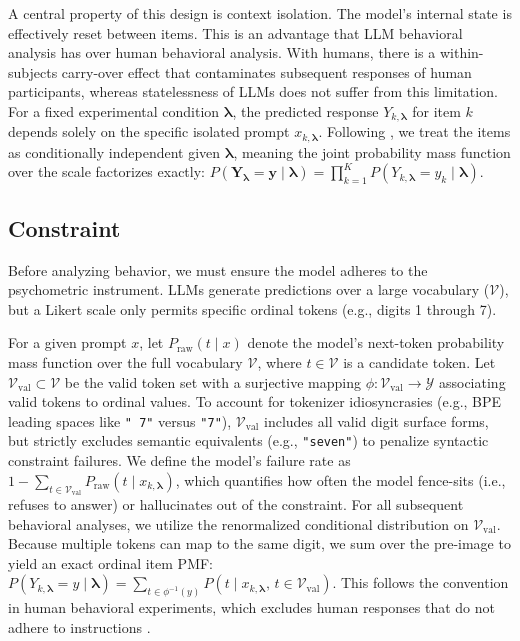 A central property of this design is context isolation. 
The model's internal state is effectively reset between items. 
This is an advantage that LLM behavioral analysis has over human behavioral analysis. 
With humans, there is a within-subjects carry-over effect that contaminates subsequent responses of human participants, whereas statelessness of LLMs does not suffer from this limitation.
For a fixed experimental condition $\boldsymbol{\lambda}$, the predicted response $Y_{k,\boldsymbol{\lambda}}$ for item $k$ depends solely on the specific isolated prompt $x_{k,\boldsymbol{\lambda}}$. 
Following \citet{wadi2025a}, we treat the items as conditionally independent given $\boldsymbol{\lambda}$, meaning the joint probability mass function over the scale factorizes exactly: $P(\mathbf{Y}_{\boldsymbol{\lambda}} = \mathbf{y} \mid \boldsymbol{\lambda}) = \prod_{k=1}^{K} P(Y_{k,\boldsymbol{\lambda}} = y_k \mid \boldsymbol{\lambda})$.


\subsection{Constraint}

Before analyzing behavior, we must ensure the model adheres to the psychometric instrument. LLMs generate predictions over a large vocabulary ($\mathcal{V}$), but a Likert scale only permits specific ordinal tokens (e.g., digits 1 through 7). 

For a given prompt $x$, let $P_{\mathrm{raw}}(t \mid x)$ denote the model's next-token probability mass function over the full vocabulary $\mathcal{V}$, where $t \in \mathcal{V}$ is a candidate token. 
Let $\mathcal{V}_{\mathrm{val}}\subset\mathcal{V}$ be the valid token set with a surjective mapping $\phi:\mathcal{V}_{\mathrm{val}}\to\mathcal{Y}$ associating valid tokens to ordinal values. 
To account for tokenizer idiosyncrasies (e.g., BPE leading spaces like \texttt{" 7"} versus \texttt{"7"}), $\mathcal{V}_{\mathrm{val}}$ includes all valid digit surface forms, but strictly excludes semantic equivalents (e.g., \texttt{"seven"}) to penalize syntactic constraint failures.
We define the model's failure rate as $1-\sum_{t\in\mathcal{V}_{\mathrm{val}}}P_{\mathrm{raw}}(t\mid x_{k,\boldsymbol{\lambda}})$, 
which quantifies how often the model fence-sits (i.e., refuses to answer) or hallucinates out of the constraint. 
For all subsequent behavioral analyses, we utilize the renormalized conditional distribution on $\mathcal{V}_{\mathrm{val}}$. Because multiple tokens can map to the same digit, we sum over the pre-image to yield an exact ordinal item PMF: 
$P(Y_{k,\boldsymbol{\lambda}}=y \mid \boldsymbol{\lambda})=\sum_{t \in \phi^{-1}(y)} P\!\left(t \mid x_{k,\boldsymbol{\lambda}},\,t\in\mathcal{V}_{\mathrm{val}}\right)$.
This follows the convention in human behavioral experiments,
which excludes human responses that do not adhere to instructions \citep{cronbach1950further}.


